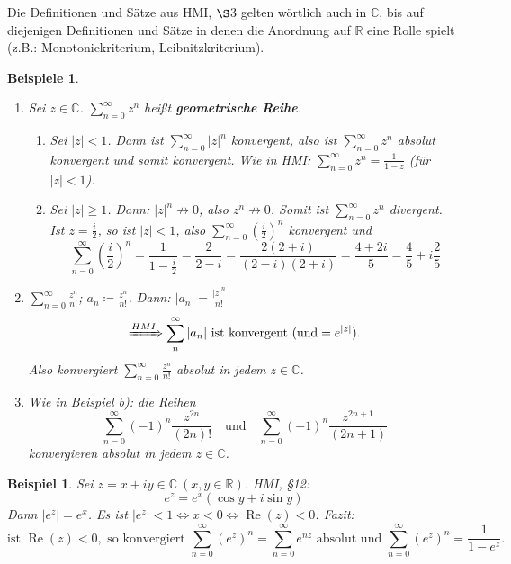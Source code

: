 \documentclass[12pt]{extreport} %
\newcommand{\C}{\mathbb{C}}
\newcommand{\R}{\mathbb{R}}
\theoremstyle{named}
\theoremstyle{nnamed}
\theoremstyle{itshape}
\theoremstyle{normal}
\newtheorem{beispiel}[unnamedtheorem]{Beispiel}
\newtheorem*{beispiele}{Beispiele}
\begin{document}
Die Definitionen und Sätze aus HMI, $\S$3 gelten wörtlich auch in $\C$, bis auf diejenigen Definitionen und Sätze in denen die Anordnung auf $\R$ eine Rolle spielt (z.B.: Monotoniekriterium, Leibnitzkriterium).

\begin{beispiele} ~\
	\begin{enumerate}
		\item Sei $z \in \C$. $\sum_{n=0}^{\infty} z^{n}$ hei{\ss}t \textbf{geometrische Reihe}. 
			\begin{enumerate}
				\item Sei $|z| < 1$. Dann ist $\sum_{n=0}^{\infty} |z|^{n}$ konvergent, also ist $\sum_{n=0}^{\infty} z^{n}$ absolut konvergent und somit konvergent. Wie in HMI: $\sum_{n=0}^{\infty} z^{n} = \frac{1}{1 - z}$ (für $|z| < 1$).
				\item Sei $|z| \geq 1$. Dann: $|z|^{n} \not\rightarrow 0$, also $z^{n} \not\rightarrow 0$. Somit ist $\sum_{n=0}^{\infty} z^{n}$ divergent. \\
					Ist $z = \frac{i}{2}$, so ist $|z| < 1$, also $\sum_{n=0}^{\infty} \left( \frac{i}{2} \right)^{n}$ konvergent und 
					$$ \sum_{n=0}^{\infty} \left( \frac{i}{2} \right)^{n} = \frac{1}{1 - \frac{i}{2}} = \frac{2}{2 - i} = \frac{2 (2 + i)}{(2-i)(2+i)} = \frac{4 + 2i}{5} = \frac{4}{5} + i \frac{2}{5} $$
			\end{enumerate}
		\item $\sum_{n=0}^{\infty} \frac{z^{n}}{n!}$; $a_{n} \coloneqq \frac{z^{n}}{n!}$. Dann: $|a_{n}| = \frac{|z|^{n}}{n!}$ 
			$$ \xRightarrow[]{HMI} \sum_{n}^{\infty} |a_{n}| \text{ ist konvergent } (\text{und} =e^{|z|}). $$
			Also konvergiert $\sum_{n=0}^{\infty} \frac{z^{n}}{n!}$ absolut in jedem $z \in \C$.
		\item Wie in Beispiel b): die Reihen
			$$ \sum_{n=0}^{\infty} (-1)^{n} \frac{z^{2n}}{(2n)!} \quad \text{und} \quad \sum_{n=0}^{\infty} (-1)^{n} \frac{z^{2n+1}}{(2n+1)} $$
			konvergieren absolut in jedem $z \in \C$.
	\end{enumerate}	
\end{beispiele}


\begin{beispiel}  \label{17.2:satz}
	Sei $z = x + iy \in \C ~(x, y \in \R)$. HMI, \S12:
		$$ e^{z} = e^{x} \left( \cos y + i \sin y \right) $$
	Dann $\left| e^{z} \right| = e^{x}$. Es ist $\left| e^{z} \right| < 1 \iff x < 0 \iff \operatorname{Re}(z) < 0$. Fazit:
		$$ \text{ist } \operatorname{Re}(z) < 0, \text{ so konvergiert } \sum_{n=0}^{\infty} \left( e^{z} \right)^{n} = \sum_{n=0}^{\infty} e^{nz} \text{ absolut und } \sum_{n=0}^{\infty} \left( e^{z} \right)^{n} = \frac{1}{1 - e^{z}}. $$
\end{beispiel}
\end{document}
